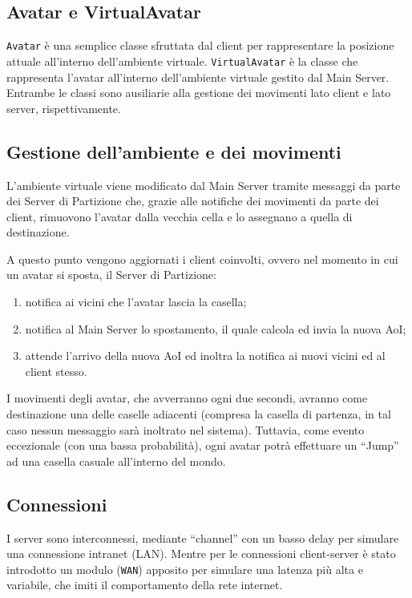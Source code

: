 \documentclass[a4paper, 11pt, oneside]{book}
\theoremstyle{definition}
\theoremstyle{remark}
\begin{document}
\subsection{Avatar e VirtualAvatar}
\texttt{Avatar} è una semplice classe sfruttata dal client per rappresentare
la posizione attuale all'interno dell'ambiente virtuale.
\texttt{VirtualAvatar} è la classe che rappresenta l'avatar all'interno
dell'ambiente virtuale gestito dal Main Server. Entrambe le classi sono
ausiliarie alla gestione dei movimenti lato client e lato server,
rispettivamente.


\subsection{Gestione dell'ambiente e dei movimenti}
L'ambiente virtuale viene modificato dal Main Server tramite messaggi da parte
dei Server di Partizione che, grazie alle notifiche dei
movimenti da parte dei client, rimuovono l'avatar dalla vecchia cella
e lo assegnano a quella di destinazione.

A questo punto vengono aggiornati i client coinvolti, ovvero nel momento
in cui un avatar si sposta, il Server di Partizione:
\begin{enumerate}
\item
notifica ai vicini che l'avatar lascia la casella;
\item
notifica al Main Server lo spostamento, il quale calcola ed invia la nuova
AoI;
\item
attende l'arrivo della nuova AoI ed inoltra la notifica ai nuovi vicini ed al
client stesso.
\end{enumerate}

I movimenti degli avatar, che avverranno ogni due secondi, avranno come
destinazione una delle caselle adiacenti (compresa la casella di partenza,
in tal caso nessun messaggio sarà inoltrato nel sistema). Tuttavia,
come evento eccezionale (con una bassa probabilità), ogni avatar potrà
effettuare un ``Jump'' ad una casella casuale all'interno del mondo.

\subsection{Connessioni}
I server sono interconnessi, mediante ``channel'' con un basso delay
per simulare una connessione intranet (LAN). Mentre per le connessioni
client-server è stato introdotto un modulo (\texttt{WAN}) apposito per simulare
una latenza più alta e variabile, che imiti il comportamento della rete
internet.
\end{document}
